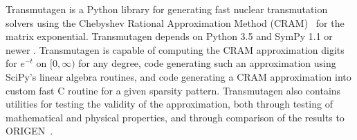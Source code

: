 Transmutagen is a Python library for generating fast nuclear transmutation
solvers using the Chebyshev Rational Approximation Method
(CRAM)~\cite{ationneeded} for the matrix exponential. Transmutagen depends on
Python 3.5 and SymPy 1.1 or newer . Transmutagen is
capable of computing the CRAM approximation digits for $e^{-t}$ on
$[0, \infty)$ for any degree, code generating such an approximation using
SciPy's linear algebra routines, and code generating a CRAM approximation into
custom fast C routine for a given sparsity pattern. Transmutagen also contains
utilities for testing the validity of the approximation, both through testing
of mathematical and physical properties, and through comparison of the results
to ORIGEN~\cite{ationneeded}.
